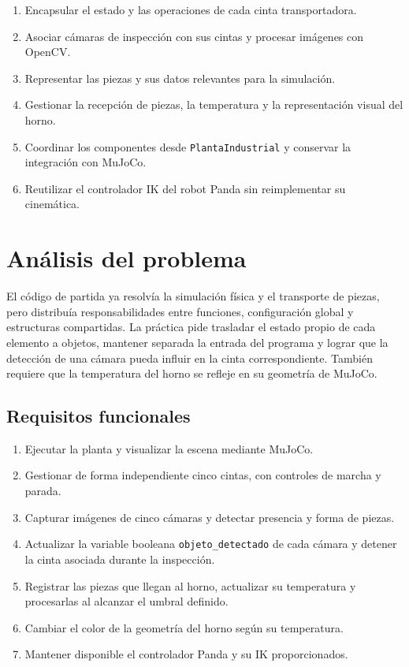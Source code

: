 \documentclass[12pt,a4paper]{article}
\begin{document}
\begin{enumerate}
    \item Encapsular el estado y las operaciones de cada cinta transportadora.
    \item Asociar cámaras de inspección con sus cintas y procesar imágenes con OpenCV.
    \item Representar las piezas y sus datos relevantes para la simulación.
    \item Gestionar la recepción de piezas, la temperatura y la representación visual del horno.
    \item Coordinar los componentes desde \texttt{PlantaIndustrial} y conservar la integración con MuJoCo.
    \item Reutilizar el controlador IK del robot Panda sin reimplementar su cinemática.
\end{enumerate}


\section{Análisis del problema}

El código de partida ya resolvía la simulación física y el transporte de piezas,
pero distribuía responsabilidades entre funciones, configuración global y
estructuras compartidas. La práctica pide trasladar el estado propio de cada
elemento a objetos, mantener separada la entrada del programa y lograr que la
detección de una cámara pueda influir en la cinta correspondiente. También
requiere que la temperatura del horno se refleje en su geometría de MuJoCo.

\subsection{Requisitos funcionales}

\begin{enumerate}
    \item Ejecutar la planta y visualizar la escena mediante MuJoCo.
    \item Gestionar de forma independiente cinco cintas, con controles de marcha y parada.
    \item Capturar imágenes de cinco cámaras y detectar presencia y forma de piezas.
    \item Actualizar la variable booleana \texttt{objeto\_detectado} de cada cámara y detener la cinta asociada durante la inspección.
    \item Registrar las piezas que llegan al horno, actualizar su temperatura y procesarlas al alcanzar el umbral definido.
    \item Cambiar el color de la geometría del horno según su temperatura.
    \item Mantener disponible el controlador Panda y su IK proporcionados.
\end{enumerate}
\end{document}
